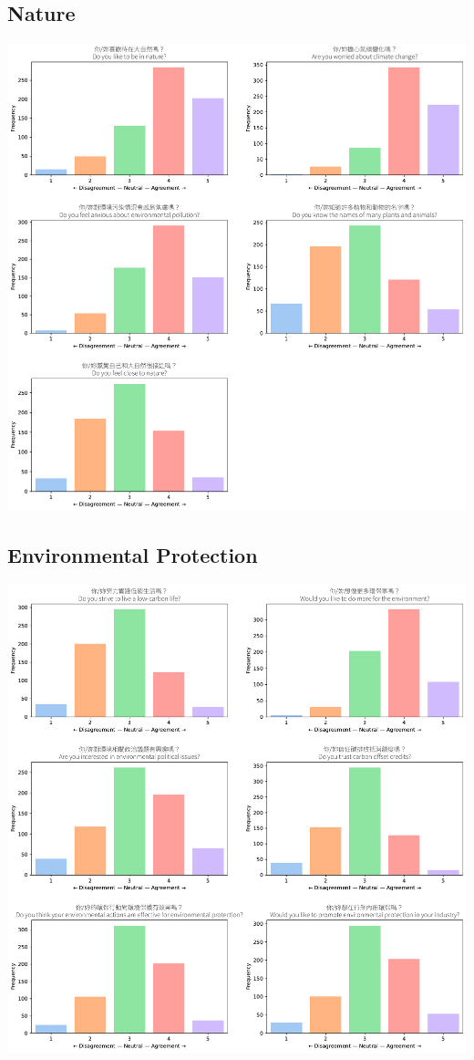 \documentclass[
  letterpaper,
  DIV=11,
  numbers=noendperiod]{scrartcl}
\begin{document}
\subsection{Nature}\label{nature}

\includegraphics{_thesis_files/figure-pdf/cell-73-output-1.pdf}

\subsection{Environmental Protection}\label{environmental-protection}

\includegraphics{_thesis_files/figure-pdf/cell-74-output-1.pdf}
\end{document}
